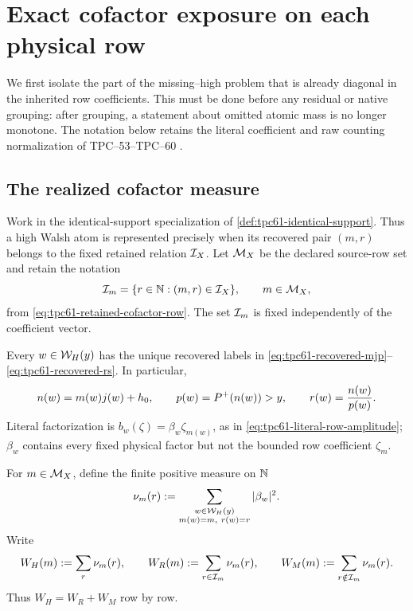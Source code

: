 \section{Exact cofactor exposure on each physical row}
\label{sec:tpc61-cofactor-exposure}

We first isolate the part of the missing--high problem that is already
diagonal in the inherited row coefficients.  This must be done before any
residual or native grouping: after grouping, a statement about omitted
atomic mass is no longer monotone.  The notation below retains the literal
coefficient and raw counting normalization of TPC--53--TPC--60
\citep{WangTPC53,WangTPC54,WangTPC59,WangTPC60}.

\subsection{The realized cofactor measure}

Work in the identical-support specialization of
\cref{def:tpc61-identical-support}.  Thus a high Walsh atom is represented
precisely when its recovered pair \((m,r)\) belongs to the fixed retained
relation \(\mathcal I_X\).  Let \(\mathcal M_X\) be the declared source-row set and
retain the notation
\begin{equation}
 \mathcal I_m=\{r\in\mathbb N:(m,r)\in\mathcal I_X\},
 \qquad m\in\mathcal M_X,
 \label{eq:tpc61-row-retained-cofactors}
\end{equation}
from \eqref{eq:tpc61-retained-cofactor-row}.  The set \(\mathcal I_m\) is fixed
independently of the coefficient vector.

Every \(w\in\mathcal W_H(y)\) has the unique recovered labels in
\eqref{eq:tpc61-recovered-mjp}--\eqref{eq:tpc61-recovered-rs}.  In
particular,
\begin{equation}
 n(w)=m(w)j(w)+h_0,
 \qquad
 p(w)=P^{+}(n(w))>y,
 \qquad
 r(w)=\frac{n(w)}{p(w)}.
 \label{eq:tpc61-recovered-prime-cofactor}
\end{equation}
Literal factorization is
\(b_w(\zeta)=\beta_w\zeta_{m(w)}\), as in
\eqref{eq:tpc61-literal-row-amplitude}; \(\beta_w\) contains every fixed
physical factor but not the bounded row coefficient \(\zeta_m\).

\begin{definition}
\label{def:tpc61-realized-cofactor-measure}
For \(m\in\mathcal M_X\), define the finite positive measure on \(\mathbb N\)
\begin{equation}
 \nu_m(r)
 :=\sum_{\substack{w\in\mathcal W_H(y)\\m(w)=m,\ r(w)=r}}
       |\beta_w|^2.
 \label{eq:tpc61-nu-m-r}
\end{equation}
Write
\begin{equation}
 W_H(m):=\sum_r\nu_m(r),\qquad
 W_R(m):=\sum_{r\in\mathcal I_m}\nu_m(r),\qquad
 W_M(m):=\sum_{r\notin\mathcal I_m}\nu_m(r).
 \label{eq:tpc61-row-HRM-weights}
\end{equation}
Thus \(W_H=W_R+W_M\) row by row.
\end{definition}

